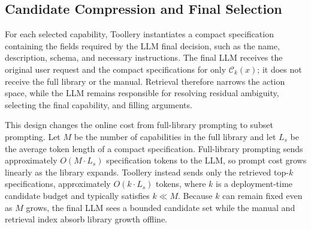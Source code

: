 \documentclass[11pt]{article}
\begin{document}
\subsection{Candidate Compression and Final Selection}
\label{subsec:selection}

For each selected capability, Toollery instantiates a compact specification containing the fields required by the LLM final decision, such as the name, description, schema, and necessary instructions. The final LLM receives the original user request and the compact specifications for only $\mathcal{C}_k(x)$; it does not receive the full library or the manual. Retrieval therefore narrows the action space, while the LLM remains responsible for resolving residual ambiguity, selecting the final capability, and filling arguments.

This design changes the online cost from full-library prompting to subset prompting. Let $M$ be the number of capabilities in the full library and let $L_s$ be the average token length of a compact specification. Full-library prompting sends approximately $O(M\cdot L_s)$ specification tokens to the LLM, so prompt cost grows linearly as the library expands. Toollery instead sends only the retrieved top-$k$ specifications, approximately $O(k\cdot L_s)$ tokens, where $k$ is a deployment-time candidate budget and typically satisfies $k\ll M$. Because $k$ can remain fixed even as $M$ grows, the final LLM sees a bounded candidate set while the manual and retrieval index absorb library growth offline.
\end{document}
